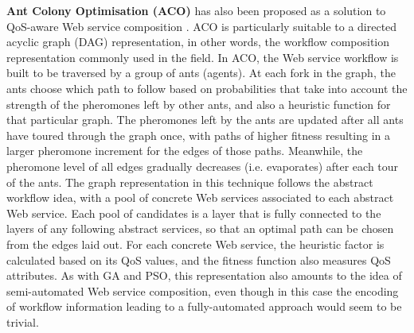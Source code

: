 \textbf{Ant Colony Optimisation (ACO)} has also been proposed as a solution to QoS-aware Web service composition \cite{zhang2010qos}. ACO is particularly suitable to a directed acyclic graph (DAG) representation, in other words, the workflow composition representation commonly used in the field. In ACO, the Web service workflow is built to be traversed by a group of ants (agents). At each fork in the graph, the ants choose which path to follow based on probabilities that take into account the strength of the pheromones left by other ants, and also a heuristic function for that particular graph. The pheromones left by the ants are updated after all ants have toured through the graph once, with paths of higher fitness resulting in a larger pheromone increment for the edges of those paths. Meanwhile, the pheromone level of all edges gradually decreases (i.e. evaporates) after each tour of the ants. The graph representation in this technique follows the abstract workflow idea, with a pool of concrete Web services associated to each abstract Web service. Each pool of candidates is a layer that is fully connected to the layers of any following abstract services, so that an optimal path can be chosen from the edges laid out. For each concrete Web service, the heuristic factor is calculated based on its QoS values, and the fitness function also measures QoS attributes. As with GA and PSO, this representation also amounts to the idea of semi-automated Web service composition, even though in this case the encoding of workflow information leading to a fully-automated approach would seem to be trivial.

